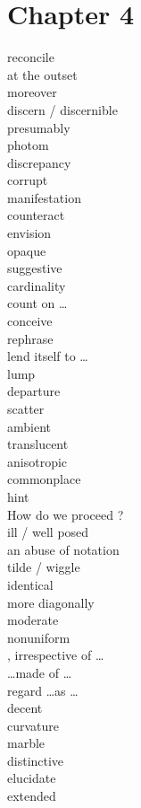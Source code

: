 \documentclass[12pt]{article}
\begin{document}
\section{Chapter 4}
reconcile  \\
at the outset  \\
moreover  \\
discern / discernible   \\
presumably  \\
photom  \\
discrepancy  \\
corrupt  \\
manifestation  \\
counteract  \\
envision  \\
opaque  \\
suggestive  \\
cardinality  \\
count on \dots  \\
conceive  \\
rephrase  \\
lend itself to \dots  \\
lump  \\
departure  \\
scatter  \\
ambient  \\
translucent  \\
anisotropic  \\
commonplace  \\
hint  \\
How do we proceed ?  \\
ill / well posed   \\
an abuse of notation   \\
tilde / wiggle   \\
identical  \\
more diagonally  \\
moderate  \\
nonuniform  \\
, irrespective of \dots   \\
\dots made of \dots   \\
regard \dots as \dots   \\
decent  \\
curvature   \\
marble   \\
distinctive   \\
elucidate  \\
extended   \\
\end{document}
